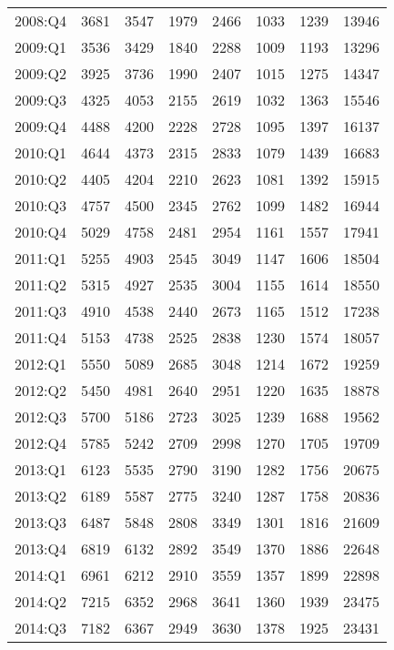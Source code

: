 \begin{footnotesize}
\begin{center}
\begin{longtable}{rrrrrrrr}
    2008:Q4 & 3681  & 3547  & 1979  & 2466  & 1033  & 1239  & 13946  \\
    2009:Q1 & 3536  & 3429  & 1840  & 2288  & 1009  & 1193  & 13296  \\
    2009:Q2 & 3925  & 3736  & 1990  & 2407  & 1015  & 1275  & 14347  \\
    2009:Q3 & 4325  & 4053  & 2155  & 2619  & 1032  & 1363  & 15546  \\
    2009:Q4 & 4488  & 4200  & 2228  & 2728  & 1095  & 1397  & 16137  \\
    2010:Q1 & 4644  & 4373  & 2315  & 2833  & 1079  & 1439  & 16683  \\
    2010:Q2 & 4405  & 4204  & 2210  & 2623  & 1081  & 1392  & 15915  \\
    2010:Q3 & 4757  & 4500  & 2345  & 2762  & 1099  & 1482  & 16944  \\
    2010:Q4 & 5029  & 4758  & 2481  & 2954  & 1161  & 1557  & 17941  \\
    2011:Q1 & 5255  & 4903  & 2545  & 3049  & 1147  & 1606  & 18504  \\
    2011:Q2 & 5315  & 4927  & 2535  & 3004  & 1155  & 1614  & 18550  \\
    2011:Q3 & 4910  & 4538  & 2440  & 2673  & 1165  & 1512  & 17238  \\
    2011:Q4 & 5153  & 4738  & 2525  & 2838  & 1230  & 1574  & 18057  \\
    2012:Q1 & 5550  & 5089  & 2685  & 3048  & 1214  & 1672  & 19259  \\
    2012:Q2 & 5450  & 4981  & 2640  & 2951  & 1220  & 1635  & 18878  \\
    2012:Q3 & 5700  & 5186  & 2723  & 3025  & 1239  & 1688  & 19562  \\
    2012:Q4 & 5785  & 5242  & 2709  & 2998  & 1270  & 1705  & 19709  \\
    2013:Q1 & 6123  & 5535  & 2790  & 3190  & 1282  & 1756  & 20675  \\
    2013:Q2 & 6189  & 5587  & 2775  & 3240  & 1287  & 1758  & 20836  \\
    2013:Q3 & 6487  & 5848  & 2808  & 3349  & 1301  & 1816  & 21609  \\
    2013:Q4 & 6819  & 6132  & 2892  & 3549  & 1370  & 1886  & 22648  \\
    2014:Q1 & 6961  & 6212  & 2910  & 3559  & 1357  & 1899  & 22898  \\
    2014:Q2 & 7215  & 6352  & 2968  & 3641  & 1360  & 1939  & 23475  \\
    2014:Q3 & 7182  & 6367  & 2949  & 3630  & 1378  & 1925  & 23431  \\

\end{longtable}
\end{center}
\end{footnotesize}
